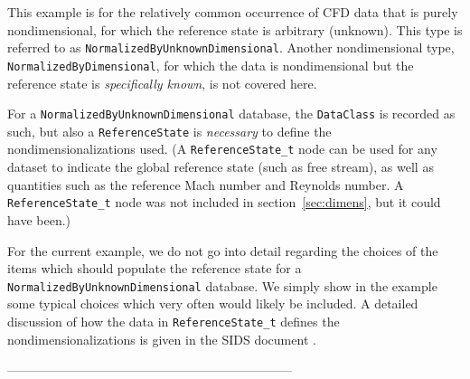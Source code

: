 \documentclass[12pt]{article}
\begin{document}
This example is for the relatively common occurrence of CFD
data that is purely nondimensional, for which the
reference state is arbitrary (unknown).  This type is referred
to as {\tt NormalizedByUnknownDimensional}.  Another nondimensional type,
{\tt NormalizedBy\-Dimensional}, for which the data is nondimensional
but the reference state is {\it specifically known}, is not covered
here.

For a {\tt NormalizedByUnknownDimensional} database, the 
{\tt DataClass} is recorded as such, but also a {\tt ReferenceState}
is {\it necessary} to define the nondimensionalizations used. 
(A {\tt ReferenceState\_t} node can be used for any dataset
to indicate the global reference state (such as free stream), as
well as
quantities such as the reference Mach number and Reynolds number.
A {\tt ReferenceState\_t} node was not included in section~\ref{sec:dimens},
but it could have been.)

For the current example, we do not go into detail regarding the 
choices of the items which should populate the reference state for
a {\tt NormalizedByUnknownDimensional} database.  We
simply show in the example some typical choices which very often would
likely be included.  A detailed
discussion of how the data in {\tt ReferenceState\_t} defines the
nondimensionalizations is given in the SIDS document \cite{ALLMARAS}.

--------------------------------------------------------------------
\end{document}

